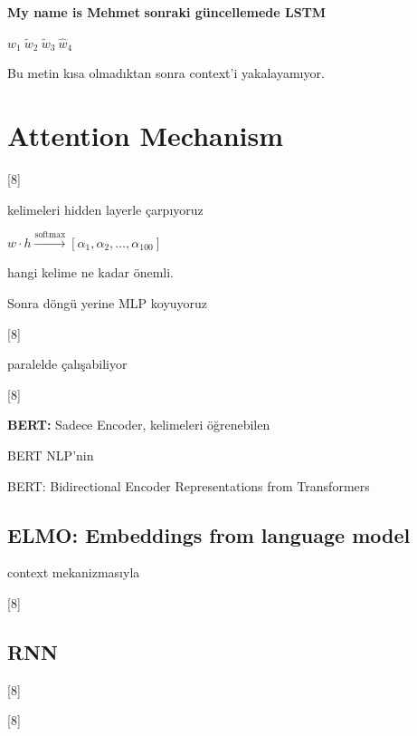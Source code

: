 \documentclass[11pt,a4paper]{article}
\begin{document}
\textbf{My name is Mehmet} \quad \textbf{sonraki güncellemede LSTM}

$w_1\ \tilde{w}_2\ \tilde{w}_3\ \hat{w}_4$

Bu metin kısa olmadıktan sonra context'i yakalayamıyor.

\section{Attention Mechanism}

[8]

kelimeleri hidden layerle çarpıyoruz

$w\cdot h \xrightarrow{\text{softmax}} [\alpha_1,\alpha_2,\dots,\alpha_{100}]$

hangi kelime ne kadar önemli.

Sonra döngü yerine MLP koyuyoruz

[8]

paralelde çalışabiliyor

[8]

\textbf{BERT:} Sadece Encoder, kelimeleri öğrenebilen

BERT NLP'nin 

BERT: Bidirectional Encoder Representations from Transformers

\subsection{ELMO: Embeddings from language model}

context mekanizmasıyla

[8]

\subsection{RNN}

[8]

[8]
\end{document}
